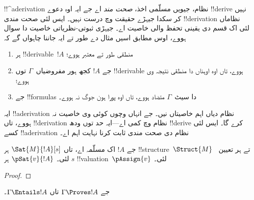 \documentclass[../../../include/open-logic-section]{subfiles}
\begin{document}
      {}
      {}
      

\begin{explain}
!!^a{derivation} نظام، جیویں مسلّمی اخذ، \emph{صحت مند} اے جے ایہ
اوہ دعوے !!{derive} نہیں کر سکدا جیہڑے حقیقت وچ درست نہیں۔ ایس لئی
صحت مندی !!{derivation} نظاماں لئی اک قسم دی یقینی تحفظ والی خاصیت اے۔
جیہڑی ثبوتی-نظریاتی خاصیت دا سوال ہووے، اوس مطابق اسیں مثال دے طور تے
ایہ جاننا چاہواں گے کہ
\begin{enumerate}
\item ہر !!{derivable}~$!A$ منطقی طور تے معتبر ہووے؛
\item جے $!A$ کجھ ہور مفروضیاں~$\Gamma$ توں !!{derivable} ہووے،
  تاں اوہ اوہناں دا منطقی نتیجہ وی ہووے؛
\item جے !!{formula}s دا سیٹ~$\Gamma$ متضاد ہووے، تاں اوہ پورا ہون جوگ نہ ہووے۔
\end{enumerate}
ایہ !!a{derivation} نظام دیاں اہم خاصیتاں نیں۔ جے انہاں وچوں کوئی
وی خاصیت نہ ہووے، تاں !!{derivation} نظام وچ کمی اے---ایہ حد توں ودھ
!!{derive} کرے گا۔ ایس لئی کسے !!a{derivation} نظام دی صحت مندی
ثابت کرنا نہایت اہم اے۔
\end{explain}

\begin{prop}
  جے $!A$ اک مسلّمہ اے، تاں
    {$\Sat{M}{!A}[s]$ ہر !!{structure}~$\Struct{M}$ تے ہر تعیین~$s$ لئی۔}
    {$\pSat{v}{!A}$ ہر !!{valuation}~$\pAssign{v}$ لئی۔}
\end{prop}

\begin{proof}
\end{proof}

\begin{thm}
جے $\Gamma \Proves !A$ تاں $\Gamma \Entails !A$۔
\end{thm}
\end{document}
